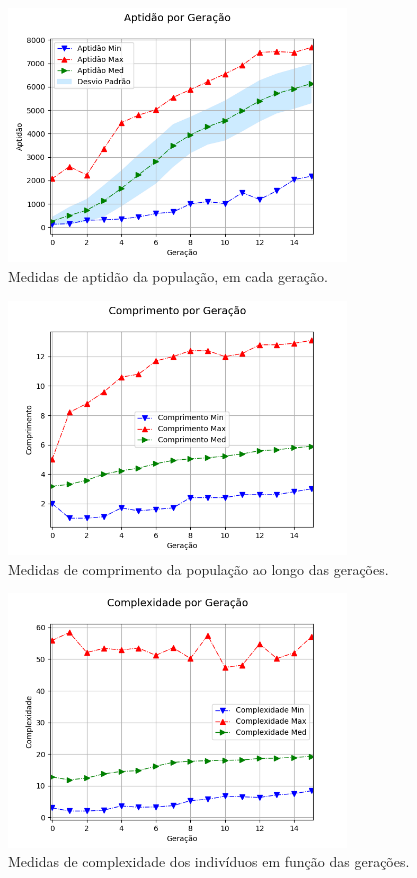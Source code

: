 \begin{figure}[H]
	\centering
	\includegraphics[width=0.8\textwidth]{02_desenvolvimento/04_EC_Fig_DPAptGer.png}
	\caption{Medidas de aptidão da população, em cada geração.}
	\label{fig:4ec-dpaptger}
\end{figure}

\begin{figure}[H]
	\centering
	\includegraphics[width=0.8\textwidth]{02_desenvolvimento/04_EC_Fig_DPCompr.png}
	\caption{Medidas de comprimento da população ao longo das gerações.}
	\label{fig:4ec-dpcompr}
\end{figure}

\begin{figure}[H]
	\centering
	\includegraphics[width=0.8\textwidth]{02_desenvolvimento/04_EC_Fig_DPCompl.png}
	\caption{Medidas de complexidade dos indivíduos em função das gerações.}
	\label{fig:4ec-dpcompl}
\end{figure}

